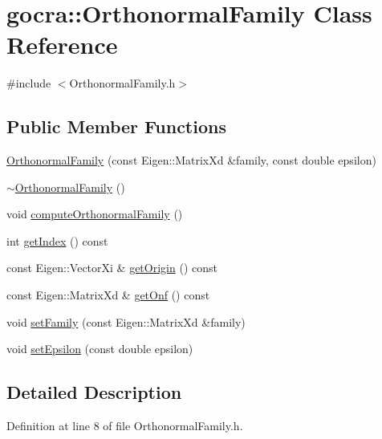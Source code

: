\hypertarget{classgocra_1_1OrthonormalFamily}{}\section{gocra\+:\+:Orthonormal\+Family Class Reference}
\label{classgocra_1_1OrthonormalFamily}


{\ttfamily \#include $<$Orthonormal\+Family.\+h$>$}

\subsection*{Public Member Functions}
\begin{DoxyCompactItemize}
\item 
\hyperlink{classgocra_1_1OrthonormalFamily_a119f335434f7695b587a40d40c5117c8}{Orthonormal\+Family} (const Eigen\+::\+Matrix\+Xd \&family, const double epsilon)
\item 
\hyperlink{classgocra_1_1OrthonormalFamily_a4c31a4a79ec5df60209cb7aa4a8e5306}{$\sim$\+Orthonormal\+Family} ()
\item 
void \hyperlink{classgocra_1_1OrthonormalFamily_a8961a7be4e0c54ebe99bd416f6de4bc3}{compute\+Orthonormal\+Family} ()
\item 
int \hyperlink{classgocra_1_1OrthonormalFamily_ab649205b932877839a44bb98a9a656ea}{get\+Index} () const 
\item 
const Eigen\+::\+Vector\+Xi \& \hyperlink{classgocra_1_1OrthonormalFamily_a8e918442b72dc4f33d419cda98d03b85}{get\+Origin} () const 
\item 
const Eigen\+::\+Matrix\+Xd \& \hyperlink{classgocra_1_1OrthonormalFamily_a22c363958b8d599e2cbbfc5ec00b8654}{get\+Onf} () const 
\item 
void \hyperlink{classgocra_1_1OrthonormalFamily_a503aee1056787a99c703ef5af439a9fe}{set\+Family} (const Eigen\+::\+Matrix\+Xd \&family)
\item 
void \hyperlink{classgocra_1_1OrthonormalFamily_a6a1956253f62f00929b60c848e7b35f5}{set\+Epsilon} (const double epsilon)
\end{DoxyCompactItemize}


\subsection{Detailed Description}


Definition at line 8 of file Orthonormal\+Family.\+h.



